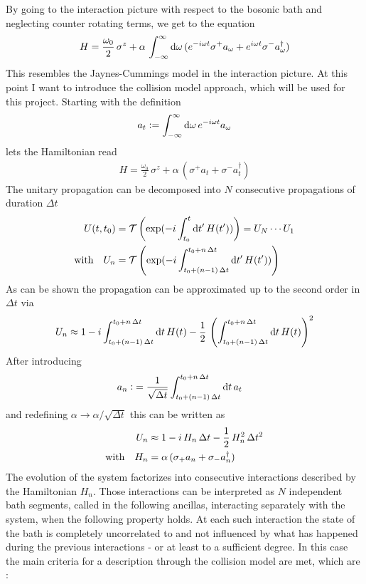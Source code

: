 \documentclass{article}
\begin{document}
By going to the interaction picture with respect to the bosonic bath and neglecting counter rotating terms, we get to the equation
\begin{align*}
    H= \frac{\omega_0}{2}\,\sigma^z+ \alpha\,\int_{-\infty}^\infty\text{d}\omega\,(e^{-i\omega t}\sigma^+a_\omega+e^{i\omega t}\sigma^-a^\dagger_\omega)
\end{align*}
This resembles the Jaynes-Cummings model in the interaction picture. At this point I want to introduce the collision model approach, which will be used for this project. Starting with the definition
\begin{align*}
    a_t\vcentcolon=\int_{-\infty}^{\infty}\text{d}\omega\,e^{-i\omega t}a_\omega
\end{align*}
lets the Hamiltonian read
\begin{align*}
    H= \frac{\omega_0}{2}\,\sigma^z+ \alpha\,(\sigma^+a_t+\sigma^-a^\dagger_t)
\end{align*}
The unitary propagation can be decomposed into $N$ consecutive propagations of duration $\Delta t$
\begin{align*}
    U(t,t_0)&=\mathcal{T}\left(  \exp(-i\int_{t_0}^t\text{d} t'\,H(t'))  \right)=U_{N}\cdots U_1\\
    \text{with}\quad U_n&=\mathcal{T}\left( \exp(-i\int_{t_0+(n-1)\,\Delta t}^{t_0+n\,\Delta t}\text{d} t'\,H(t'))  \right)
\end{align*}
As can be shown\cite{ciccarello_cm} the propagation can be approximated up to the second order in $\Delta t$ via
\begin{align*}
    U_n \approx 1-i\int_{t_0+(n-1)\,\Delta t}^{t_0+n\,\Delta t}\text{d} t \,H(t) - \frac{1}{2}\,\left(\int_{t_0+(n-1)\,\Delta t}^{t_0+n\,\Delta t}\text{d} t \,H(t)\right)^2
\end{align*}
After introducing
\begin{align*}
    a_n\vcentcolon&=\frac{1}{\sqrt{\Delta t}}\int_{t_0+(n-1)\,\Delta t}^{t_0+n\,\Delta t}\text{d} t\,a_t
\end{align*}
and redefining $\alpha\rightarrow\alpha/\sqrt{\Delta t}$ this can be written as
\begin{align*}
    U_n &\approx 1-i\,H_n \,\Delta t-\frac{1}{2}\,H_n^2\,\Delta t^2\\
    \text{with}\quad H_n&=\alpha\,(\sigma_+a_n+\sigma_-a^\dagger_n)
\end{align*}
The evolution of the system factorizes into consecutive interactions described by the Hamiltonian $H_n$. Those interactions can be interpreted as $N$ independent bath segments, called in the following ancillas, interacting separately with the system, when the following property holds. At each such interaction the state of the bath is completely uncorrelated  to and not influenced by what has happened during the previous interactions - or at least to a sufficient degree. In this case the main criteria for a description through the collision model are met, which are \cite{ciccarello_cm}:
\end{document}
